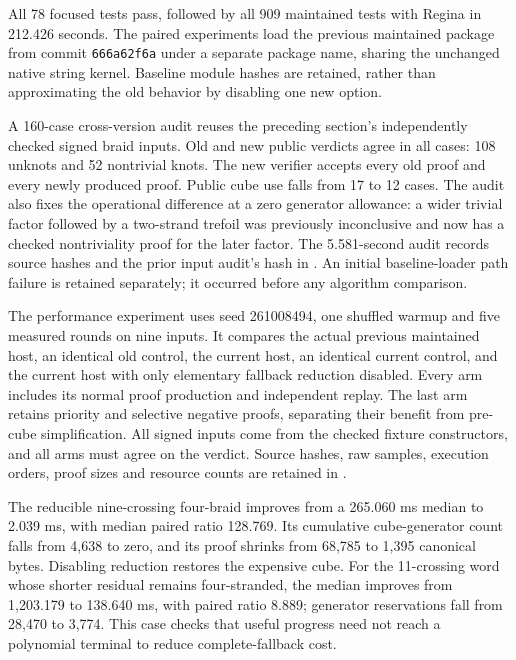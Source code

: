 All 78 focused tests pass, followed by all 909 maintained tests with Regina in
212.426 seconds. The paired experiments load the previous maintained package
from commit \texttt{666a62f6a} under a separate package name, sharing the
unchanged native string kernel. Baseline module hashes are retained, rather
than approximating the old behavior by disabling one new option.

A 160-case cross-version audit reuses the preceding section's independently
checked signed braid inputs. Old and new public verdicts agree in all cases:
108 unknots and 52 nontrivial knots. The new verifier accepts every old proof
and every newly produced proof. Public cube use falls from 17 to 12 cases.
The audit also fixes the operational difference at a zero generator allowance:
a wider trivial factor followed by a two-strand trefoil was previously
inconclusive and now has a checked nontriviality proof for the later factor.
The 5.581-second audit records source hashes and the prior input audit's hash
in . An initial baseline-loader path
failure is retained separately; it occurred before any algorithm comparison.



The performance experiment uses seed 261008494, one shuffled warmup and five
measured rounds on nine inputs. It compares the actual previous maintained
host, an identical old control, the current host, an identical current control,
and the current host with only elementary fallback reduction disabled.
Every arm includes its normal proof production and independent replay.
The last arm retains priority and selective negative proofs, separating their
benefit from pre-cube simplification. All signed inputs come from the checked
fixture constructors, and all arms must agree on the verdict. Source hashes,
raw samples, execution orders, proof sizes and resource counts are retained in
.

The reducible nine-crossing four-braid improves from a 265.060 ms median to
2.039 ms, with median paired ratio 128.769. Its cumulative cube-generator
count falls from 4,638 to zero, and its proof shrinks from 68,785 to 1,395
canonical bytes. Disabling reduction restores the expensive cube. For the
11-crossing word whose shorter residual remains four-stranded, the median
improves from 1,203.179 to 138.640 ms, with paired ratio 8.889; generator
reservations fall from 28,470 to 3,774. This case checks that useful progress
need not reach a polynomial terminal to reduce complete-fallback cost.

